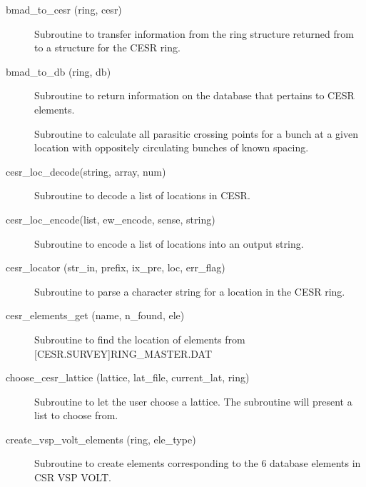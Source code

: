 \begin{description}

\item[bmad\_to\_cesr (ring, cesr)] \Newline
Subroutine to transfer information from the ring structure returned from 
 to a structure for the CESR ring.

\item[bmad\_to\_db (ring, db)] \Newline
Subroutine to return information on the database that pertains to CESR elements. 

\item[\protect\parbox{6in}{cesr\_crossings (i\_train, j\_car, species, n\_trains\_tot, 
\\ \hspace*{2in}n\_cars, cross\_positions, n\_car\_spacing, train\_spacing)}] \Newline
Subroutine to calculate all parasitic crossing points for a bunch at a given location 
with oppositely circulating bunches of known spacing. 

\item[cesr\_loc\_decode(string, array, num)] \Newline 
Subroutine to decode a list of locations in CESR.

\item[cesr\_loc\_encode(list, ew\_encode, sense, string)] \Newline 
Subroutine to encode a list of locations into an output string.

\item[cesr\_locator (str\_in, prefix, ix\_pre, loc, err\_flag)] \Newline 
Subroutine to parse a character string for a location in the CESR ring.

\item[cesr\_elements\_get (name, n\_found, ele)] \Newline 
Subroutine to find the location of elements from [CESR.SURVEY]RING\_MASTER.DAT

\item[choose\_cesr\_lattice (lattice, lat\_file, current\_lat, ring)] \Newline
Subroutine to let the user choose a lattice. The subroutine will present a list to choose from. 

\item[create\_vsp\_volt\_elements (ring, ele\_type)] \Newline
Subroutine to create elements corresponding to the 6 database elements in CSR VSP VOLT. 


\end{description}
